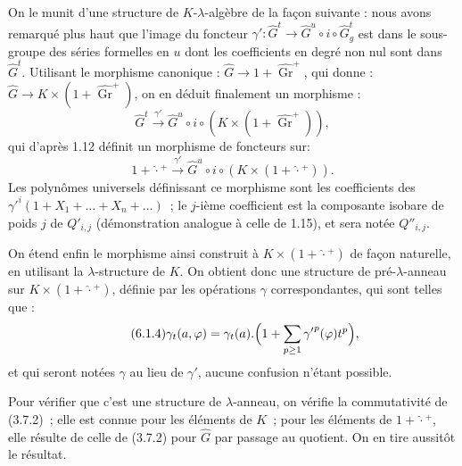 On le
munit d'une structure de \(K\)-\(\lambda\)-algèbre de la façon suivante : nous avons remarqué plus haut que l'image du foncteur \(\gamma'\colon\widehat G^t\longrightarrow\widehat G^u\circ i\circ\widehat G^t_g\) est dans le sous-groupe des séries formelles en \(u\) dont les coefficients en degré non nul sont dans \(\widehat G^t\). Utilisant le morphisme canonique : \(\widehat G\longrightarrow 1+\widehat{\operatorname{Gr}}^{+}\), qui donne : \(\widehat G\longrightarrow K\times(1+\widehat{\operatorname{Gr}}^{+})\), on en déduit finalement un morphisme :
\[
  \widehat G^t\xrightarrow{\gamma'}\widehat G^u\circ i\circ(K\times(1+\widehat{\operatorname{Gr}}^{+})),
\]
qui d'après 1.12 définit un morphisme de foncteurs sur\qquad:
\[
  1+\widehat{\cdot}{}^{+}\xrightarrow{\gamma'}\widehat G^u\circ i\circ(K\times(1+\widehat{\cdot}{}^{+})).
\]
Les polynômes universels définissant ce morphisme sont les coefficients des \({\gamma'}^{i}(1+X_1+\dots+X_n+\dots)\)~; le \(j\)-ième coefficient est la composante isobare de poids \(j\) de \(Q'_{i,j}\) (démonstration analogue à celle de 1.15), et sera notée \(Q''_{i,j}\).

On étend enfin le morphisme ainsi construit à \(K\times(1+\widehat{\cdot}{}^{+})\) de façon naturelle, en utilisant la \(\lambda\)-structure de \(K\). On obtient donc une structure de pré-\(\lambda\)-anneau sur \(K\times(1+\widehat{\cdot}{}^{+})\), définie par les opérations \(\gamma\) correspondantes, qui sont telles que :
\begin{equation}\tag{6.1.4}
  \gamma_t(a,\varphi)=\gamma_t(a).\Bigl(1+\sum_{p\ge1}{\gamma'}^{p}(\varphi)t^{p}\Bigr),
\end{equation}
et qui seront notées \(\gamma\) au lieu de \(\gamma'\), aucune confusion n'étant possible.

Pour vérifier que c'est une structure de \(\lambda\)-anneau, on vérifie la commutativité de (3.7.2)~; elle est connue pour les éléments de \(K\)~; pour les éléments de \(1+\widehat{\cdot}{}^{+}\), elle résulte de celle de (3.7.2) pour \(\widehat G\) par passage au quotient. On en tire aussitôt le résultat.



\providecommand{\Ghat}{\widehat G}
\providecommand{\Aqhat}{\widehat A_{\mathbb Q}}
\providecommand{\Ch}{\operatorname{Ch}}
\providecommand{\Log}{\operatorname{Log}}
\renewcommand{\id}{\operatorname{id}}
\providecommand{\gr}{\operatorname{gr}}
\providecommand{\Hom}{\operatorname{Hom}}
\providecommand{\epsi}{\varepsilon}
\providecommand{\clgr}{\operatorname{cl}}
\providecommand{\Fil}{\operatorname{Fil}}
\providecommand{\Gr}{\operatorname{Gr}}
\providecommand{\Sym}{\operatorname{Sym}}


